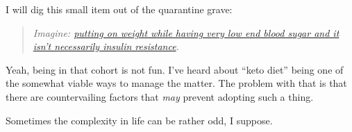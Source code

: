 I will dig this small item out of the quarantine grave:

\begin{quote}
\emph{Imagine: \href{https://pubmed.ncbi.nlm.nih.gov/22970944/}{putting
on weight while having very low end blood sugar and it isn't necessarily
insulin resistance}.}
\end{quote}

Yeah, being in that cohort is not fun. I've heard about ``keto diet''
being one of the somewhat viable ways to manage the matter. The problem
with that is that there are countervailing factors that \emph{may}
prevent adopting such a thing.

Sometimes the complexity in life can be rather odd, I suppose.
